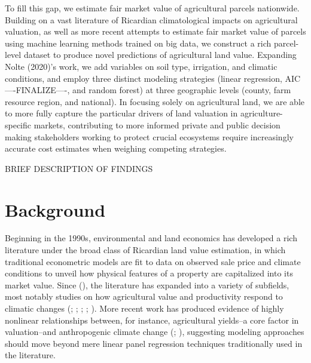 \documentclass[12pt]{article}
\begin{document}
\par To fill this gap, we estimate fair market value of agricultural parcels nationwide. Building on a vast literature of Ricardian climatological impacts on agricultural valuation, as well as more recent attempts to estimate fair market value of parcels using machine learning methods trained on big data, we construct a rich parcel-level dataset to produce novel predictions of agricultural land value. Expanding Nolte (2020)'s work, we add variables on soil type, irrigation, and climatic conditions, and employ three distinct modeling strategies (linear regression, AIC ----FINALIZE----, and random forest) at three geographic levels (county, farm resource region, and national). In focusing solely on agricultural land, we are able to more fully capture the particular drivers of land valuation in agriculture-specific markets, contributing to more informed private and public decision making  stakeholders working to protect crucial ecosystems require increasingly accurate cost estimates when weighing competing strategies.

BRIEF DESCRIPTION OF FINDINGS

\section{Background}
Beginning in the 1990s, environmental and land economics has developed a rich literature under the broad class of Ricardian land value estimation, in which traditional econometric models are fit to data on observed sale price and climate conditions to unveil how physical features of a property are capitalized into its market value. Since (\cite{Mendelsohn1994TheAnalysis}), the literature has expanded into a variety of subfields, most notably studies on how agricultural value and productivity respond to climatic changes (\cite{Schlenker2005WillApproach}; \cite{Schlenker2006TheConditions}; \cite{Nelson2014ClimateShocks}; \cite{Mendelsohn2003ClimateAgriculture}; \cite{Bozzola2017AAgriculture}). More recent work has produced evidence of highly nonlinear relationships between, for instance, agricultural yields--a core factor in valuation--and anthropogenic climate change (\cite{Schlenker2006NonlinearYields}; \cite{Schlenker2009NonlinearChange}), suggesting modeling approaches should move beyond mere linear panel regression techniques traditionally used in the literature.
\end{document}
